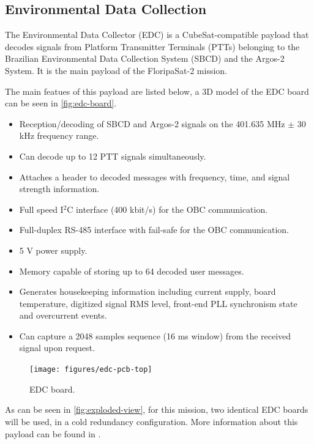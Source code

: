 \subsection{Environmental Data Collection}

The Environmental Data Collector (EDC) is a CubeSat-compatible payload that decodes signals from Platform Transmitter Terminals (PTTs) belonging to the Brazilian Environmental Data Collection System (SBCD) and the Argos-2 System. It is the main payload of the FloripaSat-2 mission.

The main featues of this payload are listed below, a 3D model of the EDC board can be seen in \autoref{fig:edc-board}.

\begin{itemize}
    \item Reception/decoding of SBCD and Argos-2 signals on the 401.635 MHz $\pm$ 30 kHz frequency range.
    \item Can decode up to 12 PTT signals simultaneously.
    \item Attaches a header to decoded messages with frequency, time, and signal strength information.
    \item Full speed I$^{2}$C interface (400 kbit/s) for the OBC communication.
    \item Full-duplex RS-485 interface with fail-safe for the OBC communication.
    \item 5 V power supply.
    \item Memory capable of storing up to 64 decoded user messages.
    \item Generates housekeeping information including current supply, board temperature, digitized signal RMS level, front-end PLL synchronism state and overcurrent events.
    \item Can capture a 2048 samples sequence (16 ms window) from the received signal upon request.
\end{itemize}

\begin{figure}[!ht]
    \begin{center}
        \texttt{[image: figures/edc-pcb-top]}
        \caption{EDC board.}
        \label{fig:edc-board}
    \end{center}
\end{figure}

As can be seen in \autoref{fig:exploded-view}, for this mission, two identical EDC boards will be used, in a cold redundancy configuration. More information about this payload can be found in \cite{edc}.

